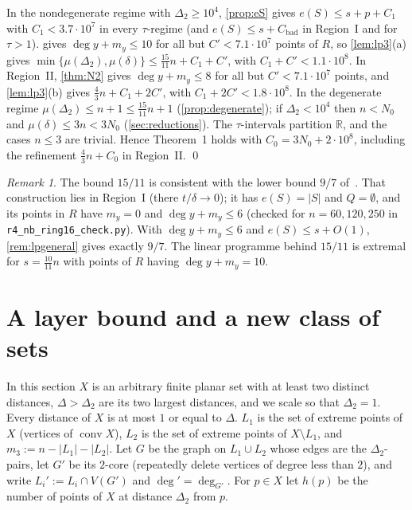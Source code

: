 \documentclass[11pt]{amsart}
\theoremstyle{definition}
\theoremstyle{remark}
\newtheorem{remark}[theorem]{Remark}
\newcommand{\R}{\mathbb{R}}
\newcommand{\Dt}{\Delta_2}
\newcommand{\mult}{\mu}
\newcommand{\conv}{\operatorname{conv}}
\begin{document}
In the nondegenerate regime with $\Dt\ge10^4$, \cref{prop:eS} gives $e(S)\le s+p+C_1$ with $C_1<3.7\cdot10^7$ in every $\tau$-regime (and $e(S)\le s+C_{\mathrm{bad}}$ in Region~I and for $\tau>1$).  gives $\deg y+m_y\le10$ for all but $C'<7.1\cdot10^7$ points of $R$, so \cref{lem:lp3}(a) gives $\min\{\mult(\Dt),\mult(\delta)\}\le\frac{15}{11}n+C_1+C'$, with $C_1+C'<1.1\cdot10^8$. In Region~II, \cref{thm:N2} gives $\deg y+m_y\le8$ for all but $C'<7.1\cdot10^7$ points, and \cref{lem:lp3}(b) gives $\frac43n+C_1+2C'$, with $C_1+2C'<1.8\cdot10^8$. In the degenerate regime $\mult(\Dt)\le n+1\le\frac{15}{11}n+1$ (\cref{prop:degenerate}); if $\Dt<10^4$ then $n<N_0$ and $\mult(\delta)\le3n<3N_0$ (\cref{sec:reductions}). The $\tau$-intervals partition $\R$, and the cases $n\le3$ are trivial. Hence Theorem~1 holds with $C_0=3N_0+2\cdot10^8$, including the refinement $\frac43n+C_0$ in Region~II. \qed

\begin{remark}\label{rem:ienjoy}
The bound $15/11$ is consistent with the lower bound $9/7$ of~\cite{ienjoymath}. That construction lies in Region~I (there $t/\delta\to0$); it has $e(S)=|S|$ and $Q=\emptyset$, and its points in $R$ have $m_y=0$ and $\deg y+m_y\le6$ (checked for $n=60,120,250$ in \texttt{r4\_nb\_ring16\_check.py}). With $\deg y+m_y\le6$ and $e(S)\le s+O(1)$, \cref{rem:lpgeneral} gives exactly $9/7$. The linear programme behind $15/11$ is extremal for $s=\frac{10}{11}n$ with points of $R$ having $\deg y+m_y=10$.
\end{remark}

\section{A layer bound and a new class of sets}\label{sec:layers}

In this section $X$ is an arbitrary finite planar set with at least two distinct distances, $\Delta>\Dt$ are its two largest distances, and we scale so that $\Dt=1$. Every distance of $X$ is at most $1$ or equal to $\Delta$. $L_1$ is the set of extreme points of $X$ (vertices of $\conv X$), $L_2$ is the set of extreme points of $X\setminus L_1$, and $m_3:=n-|L_1|-|L_2|$. Let $G$ be the graph on $L_1\cup L_2$ whose edges are the $\Dt$-pairs, let $G'$ be its $2$-core (repeatedly delete vertices of degree less than $2$), and write $L_i':=L_i\cap V(G')$ and $\deg'=\deg_{G'}$. For $p\in X$ let $h(p)$ be the number of points of $X$ at distance $\Dt$ from $p$.
\end{document}
